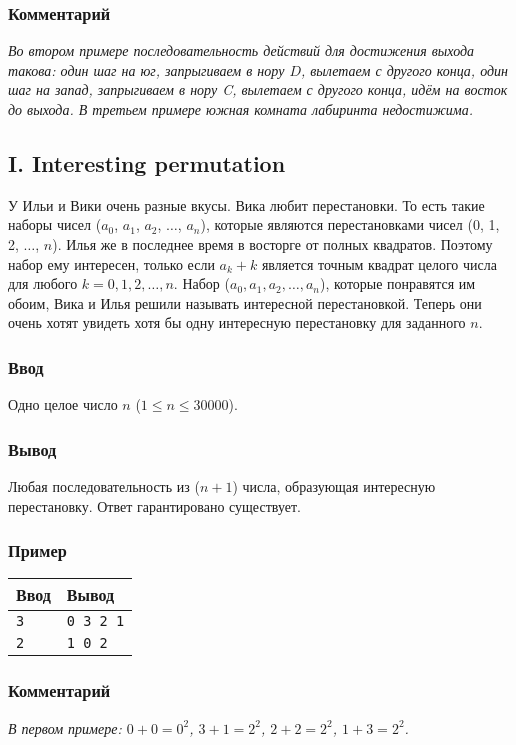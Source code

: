 \documentclass[10pt, a4paper]{article}
\newcommand{\informat}[1]
{
	\subsubsection*{Ввод} #1
}
\newcommand{\outformat}[1]
{
	\subsubsection*{Вывод} #1
}
\newcommand{\examplee}[4]
{
	\subsubsection*{Пример}
	\noindent
	\begin{center}
	\begin{tabularx}{\linewidth}{|X|X|}
	\hline
	Ввод 	& Вывод  	\\
	\hline
	{\tt #1} & {\tt #2}	\\
	\hline
	{\tt #3} & {\tt #4}	\\
	\hline
	\end{tabularx}
	\end{center}
}
\newcommand{\excomm}[1]
{
	\subsubsection*{Комментарий}
	\textit{#1}
}
\begin{document}
\excomm{Во втором примере последовательность действий для достижения выхода такова: один шаг на юг, запрыгиваем в нору $D$, вылетаем с другого конца, один шаг на запад, запрыгиваем в нору C, вылетаем с другого конца, идём на восток до выхода. В третьем примере южная комната лабиринта недостижима.}



\subsection*{I. Interesting permutation}

У Ильи и Вики очень разные вкусы. Вика любит перестановки. То есть такие наборы чисел ($a_0$, $a_1$, $a_2$, $\dots$, $a_n$), которые являются перестановками чисел (0, 1, 2, $\dots$, $n$). Илья же в последнее время в восторге от полных квадратов. Поэтому набор ему интересен, только если $a_k+k$ является точным квадрат целого числа для любого $k = 0, 1, 2, \dots, n$. Набор ($a_0, a_1, a_2, \dots, a_n$), которые понравятся им обоим, Вика и Илья решили называть интересной перестановкой. Теперь они очень хотят увидеть хотя бы одну интересную перестановку для заданного $n$.

\informat{Одно целое число $n$ ($1 \le n \le 30000$).}

\outformat{Любая последовательность из ($n+1$) числа, образующая интересную перестановку. Ответ гарантировано существует.}

\examplee{3}{0 3 2 1}{2}{1 0 2}

\excomm{В первом примере: $0 + 0 = 0^2$, $3 + 1 = 2^2$, $2 + 2 = 2^2$, $1 + 3 = 2^2$.}
\end{document}
